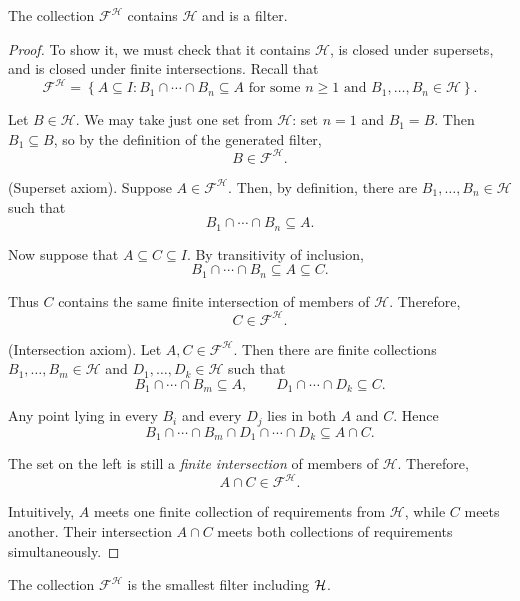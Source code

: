 {\begin{prop}
The collection \(\mathcal{F}^{\mathcal H}\) contains \(\mathcal H\) and is a
filter.
\end{prop}

\begin{proof}
To show it, we must check that it
contains \(\mathcal H\), is closed under supersets, and is closed under finite
intersections. Recall that
\[
\mathcal{F}^{\mathcal H}
=
\left\{
A \subseteq I :
B_1 \cap \cdots \cap B_n \subseteq A
\text{ for some } n \geq 1
\text{ and } B_1,\ldots,B_n \in \mathcal H
\right\}.
\]

Let \(B \in \mathcal H\). We may take just one set from \(\mathcal H\): set
\(n=1\) and \(B_1=B\). Then \(B_1 \subseteq B\), so by the definition of the
generated filter,
\[
B \in \mathcal{F}^{\mathcal H}.
\]

(Superset axiom). Suppose \(A \in \mathcal{F}^{\mathcal H}\). Then, by definition, there are
\(B_1,\ldots,B_n \in \mathcal H\) such that
\[
B_1 \cap \cdots \cap B_n \subseteq A.
\]

Now suppose that \(A \subseteq C \subseteq I\). By transitivity of
inclusion,
\[
B_1 \cap \cdots \cap B_n \subseteq A \subseteq C.
\]

Thus \(C\) contains the same finite intersection of members of
\(\mathcal H\). Therefore,
\[
C \in \mathcal{F}^{\mathcal H}.
\]

(Intersection axiom). Let \(A,C \in \mathcal{F}^{\mathcal H}\). Then there are finite collections
\(B_1,\ldots,B_m \in \mathcal H\) and
\(D_1,\ldots,D_k \in \mathcal H\) such that
\[
B_1 \cap \cdots \cap B_m \subseteq A,
\qquad
D_1 \cap \cdots \cap D_k \subseteq C.
\]

Any point lying in every \(B_i\) and every \(D_j\) lies in both \(A\) and
\(C\). Hence
\[
B_1 \cap \cdots \cap B_m
\cap
D_1 \cap \cdots \cap D_k
\subseteq
A \cap C.
\]

The set on the left is still a \emph{finite intersection} of members of
\(\mathcal H\). Therefore,
\[
A \cap C \in \mathcal{F}^{\mathcal H}.
\]

Intuitively, \(A\) meets one finite collection of requirements from
\(\mathcal H\), while \(C\) meets another. Their intersection \(A \cap C\)
meets both collections of requirements simultaneously.
\end{proof}

\begin{prop}
The collection \(\mathcal{F}^{\mathcal H}\) is the smallest filter including
\(\mathcal{H}\).
\end{prop}

}
